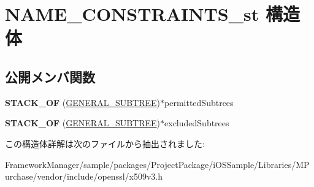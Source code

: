 \hypertarget{struct_n_a_m_e___c_o_n_s_t_r_a_i_n_t_s__st}{}\section{N\+A\+M\+E\+\_\+\+C\+O\+N\+S\+T\+R\+A\+I\+N\+T\+S\+\_\+st 構造体}
\label{struct_n_a_m_e___c_o_n_s_t_r_a_i_n_t_s__st}
\subsection*{公開メンバ関数}
\begin{DoxyCompactItemize}
\item 
\hypertarget{struct_n_a_m_e___c_o_n_s_t_r_a_i_n_t_s__st_a19f1a02049a3c38b7429359112c207cd}{}{\bfseries S\+T\+A\+C\+K\+\_\+\+O\+F} (\hyperlink{struct_g_e_n_e_r_a_l___s_u_b_t_r_e_e__st}{G\+E\+N\+E\+R\+A\+L\+\_\+\+S\+U\+B\+T\+R\+E\+E})$\ast$permitted\+Subtrees\label{struct_n_a_m_e___c_o_n_s_t_r_a_i_n_t_s__st_a19f1a02049a3c38b7429359112c207cd}

\item 
\hypertarget{struct_n_a_m_e___c_o_n_s_t_r_a_i_n_t_s__st_a7af91c5eb3b5189b56d1fe0aca379d46}{}{\bfseries S\+T\+A\+C\+K\+\_\+\+O\+F} (\hyperlink{struct_g_e_n_e_r_a_l___s_u_b_t_r_e_e__st}{G\+E\+N\+E\+R\+A\+L\+\_\+\+S\+U\+B\+T\+R\+E\+E})$\ast$excluded\+Subtrees\label{struct_n_a_m_e___c_o_n_s_t_r_a_i_n_t_s__st_a7af91c5eb3b5189b56d1fe0aca379d46}

\end{DoxyCompactItemize}


この構造体詳解は次のファイルから抽出されました\+:\begin{DoxyCompactItemize}
\item 
Framework\+Manager/sample/packages/\+Project\+Package/i\+O\+S\+Sample/\+Libraries/\+M\+Purchase/vendor/include/openssl/x509v3.\+h\end{DoxyCompactItemize}
